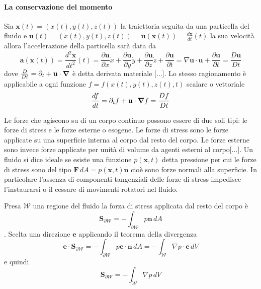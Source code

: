 \paragraph{La conservazione del momento}
Sia $\mathbf{x}(t) = (x(t),y(t),z(t))$ la traiettoria seguita da una particella del fluido e $\mathbf{u}(t) = (\dot{x}(t),\dot{y}(t),\dot{z}(t)) = \mathbf{u}(\mathbf{x}(t)) = \frac{d\mathbf{x}}{dt}(t)$ la sua velocità allora l'accelerazione della particella sarà data da
\begin{equation*} 
\mathbf{a}(\mathbf{x}(t)) = \frac{d^2\mathbf{x}}{dt^2} (t) = \frac{\partial  \mathbf{u}}{\partial x}\dot{x} + \frac{\partial  \mathbf{u}}{\partial y}\dot{y} + \frac{\partial  \mathbf{u}}{\partial z}\dot{z} + \frac{\partial \mathbf{u}}{\partial t}
= \nabla  \mathbf{u} \cdot  \mathbf{u} + \frac{\partial \mathbf{u}}{\partial t} = \frac{D \mathbf{u}}{Dt}
\end{equation*}
dove $\frac{D}{Dt}=\partial_t + \mathbf{u}\cdot\boldsymbol{\nabla}$ è detta derivata materiale [...].
Lo stesso ragionamento è applicabile a ogni funzione $f=f(x(t),y(t),z(t),t)$ scalare o vettoriale
\begin{equation*}
\frac{df}{dt}=\partial_tf+\mathbf{u}\cdot\boldsymbol{\nabla} f = \frac{Df}{Dt}
\end{equation*}

Le forze che agiscono su di un corpo continuo possono essere di due soli tipi: le forze di stress e le forze esterne o esogene. Le forze di stress sono le forze applicate su una superficie interna al corpo dal resto del corpo. Le forze esterne sono invece forze applicate per unità di volume da agenti esterni al corpo[...]. Un fluido si dice ideale se esiste una funzione $p(\mathbf{x},t)$ detta pressione per cui le forze di stress sono del tipo $\mathbf{F}\,dA = p(\mathbf{x},t)\mathbf{n}$ cioè sono forze normali alla superficie. In particolare l'assenza di componenti tangenziali delle forze di stress impedisce l'instaurarsi o il cessare di movimenti rotatori nel fluido.

Presa $\mathcal{W}$ una regione del fluido la forza di stress applicata dal resto del corpo è
$$\mathbf{S}_{\partial\mathcal{W}} = - \int_{\partial\mathcal{W}} p\mathbf{n}\,dA$$.
Scelta una direzione $\mathbf{e}$ applicando il teorema della divergenza
$$\mathbf{e}\cdot\mathbf{S}_{\partial\mathcal{W}} = - \int_{\partial\mathcal{W}} p\mathbf{e}\cdot\mathbf{n}\,dA
                                                  = - \int_{\mathcal{W}} \nabla p \cdot \mathbf{e} \, dV $$
e quindi
$$\mathbf{S}_{\partial\mathcal{W}} = - \int_{\mathcal{W}} \nabla p \, dV $$

